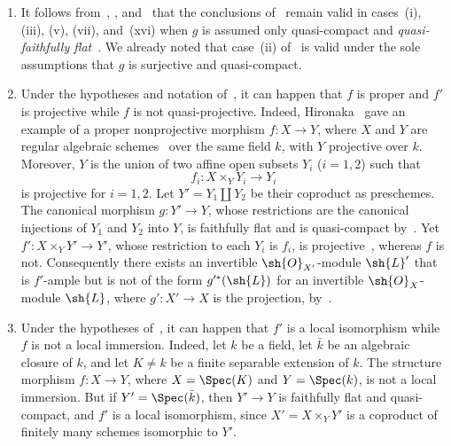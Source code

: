 \begin{remarks}[2.7.3]
\label{IV.2.7.3}
\begin{enumerate}
  \item[(i)] It follows from~, ,
  and~ that the conclusions of~
  remain valid in cases~(i), (iii), (v), (vii), and~(xvi) when $g$ is
  assumed only quasi-compact and \emph{quasi-faithfully
  flat}~. We already noted that case~(ii)
  of~ is valid under the sole assumptions that $g$ is
  surjective and quasi-compact.

  \item[(ii)] Under the hypotheses and notation of~,
  it can happen that $f$ is proper and $f'$ is projective while $f$ is
  not quasi-projective. Indeed, Hironaka~\cite{IV-34} gave an example
  of a proper nonprojective morphism $f:X\to Y$, where $X$ and $Y$ are
  regular algebraic schemes~ over the same field
  $k$, with $Y$ projective over $k$. Moreover, $Y$ is the union of two
  affine open subsets $Y_i$ \textnormal{(}$i=1,2$\textnormal{)} such
  that
  \[
    f_i:X\times_Y Y_i\longrightarrow Y_i
  \]
  is projective for $i=1,2$. Let $Y'=Y_1\amalg Y_2$ be their
  coproduct as preschemes. The canonical morphism $g:Y'\to Y$, whose
  restrictions are the canonical injections of $Y_1$ and $Y_2$ into
  $Y$, is faithfully flat and is quasi-compact by~.
  Yet $f':X\times_Y Y'\to Y'$, whose restriction to each $Y_i$ is
  $f_i$, is projective~, whereas $f$ is not.
  Consequently there exists an invertible $\sh{O}_{X'}$-module
  $\sh{L}'$ that is $f'$-ample but is not of the form
  $g'^*(\sh{L})$ for an invertible $\sh{O}_X$-module $\sh{L}$, where
  $g':X'\to X$ is the projection, by~.

  \item[(iii)] Under the hypotheses of~, it can happen
  that $f'$ is a local isomorphism while $f$ is not a local immersion.
  Indeed, let $k$ be a field, let $\bar{k}$ be an algebraic closure of
  $k$, and let $K\neq k$ be a finite separable extension of $k$. The
  structure morphism $f:X\to Y$, where $X=\Spec(K)$ and
  $Y=\Spec(k)$, is not a local immersion. But if
  $Y'=\Spec(\bar{k})$, then $Y'\to Y$ is faithfully flat and
  quasi-compact, and $f'$ is a local isomorphism, since
  $X'=X\times_Y Y'$ is a coproduct of finitely many schemes isomorphic
  to $Y'$.
\end{enumerate}
\end{remarks}

